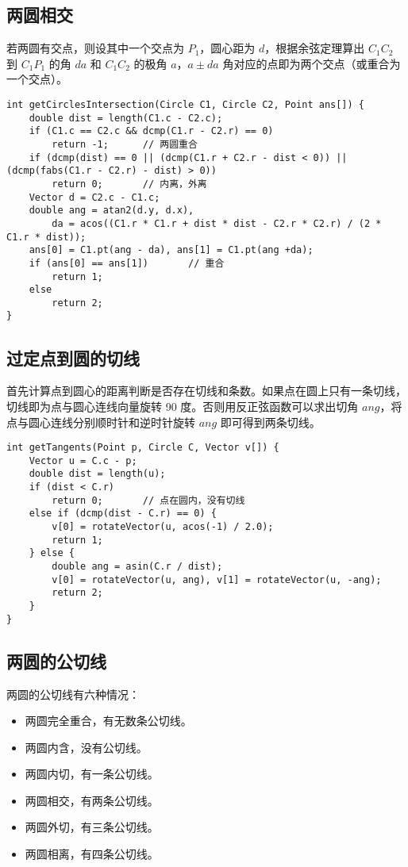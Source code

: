\subsection{两圆相交}
\noindent 若两圆有交点，则设其中一个交点为 $P_1$，圆心距为 $d$，根据余弦定理算出 $C_1C_2$ 到 $C_1P_1$ 的角 $da$ 和 $C_1C_2$ 的极角 $a$，$a \pm da$ 角对应的点即为两个交点（或重合为一个交点）。
\begin{verbatim}
int getCirclesIntersection(Circle C1, Circle C2, Point ans[]) {
    double dist = length(C1.c - C2.c);
    if (C1.c == C2.c && dcmp(C1.r - C2.r) == 0) 
        return -1;      // 两圆重合   
    if (dcmp(dist) == 0 || (dcmp(C1.r + C2.r - dist < 0)) || (dcmp(fabs(C1.r - C2.r) - dist) > 0))
        return 0;       // 内离，外离
    Vector d = C2.c - C1.c;
    double ang = atan2(d.y, d.x),
        da = acos((C1.r * C1.r + dist * dist - C2.r * C2.r) / (2 * C1.r * dist));
    ans[0] = C1.pt(ang - da), ans[1] = C1.pt(ang +da);
    if (ans[0] == ans[1])       // 重合 
        return 1;
    else
        return 2;
}
\end{verbatim}

\subsection{过定点到圆的切线}
\noindent 首先计算点到圆心的距离判断是否存在切线和条数。如果点在圆上只有一条切线，切线即为点与圆心连线向量旋转 90 度。否则用反正弦函数可以求出切角 $ang$，将点与圆心连线分别顺时针和逆时针旋转 $ang$ 即可得到两条切线。
\begin{verbatim}
int getTangents(Point p, Circle C, Vector v[]) {
    Vector u = C.c - p; 
    double dist = length(u);
    if (dist < C.r)
        return 0;       // 点在圆内，没有切线
    else if (dcmp(dist - C.r) == 0) {
        v[0] = rotateVector(u, acos(-1) / 2.0);
        return 1;
    } else {
        double ang = asin(C.r / dist);
        v[0] = rotateVector(u, ang), v[1] = rotateVector(u, -ang);
        return 2;
    }
}
\end{verbatim}

\subsection{两圆的公切线}
\noindent 两圆的公切线有六种情况：
\begin{itemize}
    \item 两圆完全重合，有无数条公切线。
    \item 两圆内含，没有公切线。
    \item 两圆内切，有一条公切线。
    \item 两圆相交，有两条公切线。
    \item 两圆外切，有三条公切线。
    \item 两圆相离，有四条公切线。
\end{itemize}

